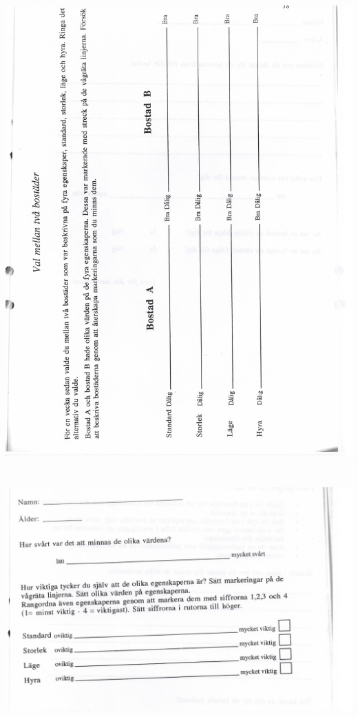 \section{}\label{app:d}\includegraphics[height=.9\textheight]{Appendencies/AppendixD}\clearpage
\section{}\label{app:e}\includegraphics{Appendencies/AppendixE}\clearpage

